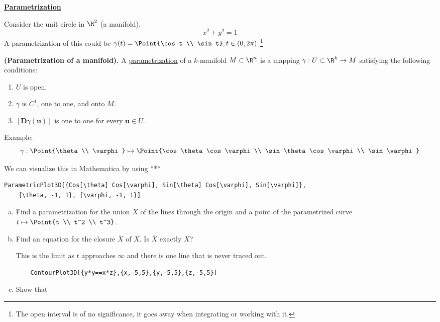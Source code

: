 
\ul{\textbf{Parametrization}}

Consider the unit circle in $\R^2$ (a manifold). 
\[x^2+y^2=1\]
A parametrization of this could be $\gamma(t)=\Point{\cos t \\ \sin t}, t\in (0,2\pi)$ \footnote{The open interval is of no significance, it goes away when integrating or working with it. }

\begin{defn}
	\textbf{(Parametrization of a manifold).} A \ul{parametrization} of a $k$-manifold $M\subset \R^n$ is a mapping $\gamma : U \subset \R^k \to M$ satisfying the following conditions: 
	\begin{enumerate}[1.]
	\item $U$ is open. 
	\item $\gamma$ is $C^1$, one to one, and onto $M$. 
	\item $\left[\mathbf{D}\gamma (\bm{u})\right]$ is one to one for every $\bm{u}\in U$. 
	\end{enumerate}
\end{defn}

Example: 
\[\gamma : \Point{\theta \\ \varphi} \mapsto \Point{\cos \theta \cos \varphi \\ \sin \theta \cos \varphi \\ \sin \varphi}\]

We can visualize this in Mathematica by using
***
\lstset{language=Mathematica}
\footnotesize
\begin{lstlisting}
ParametricPlot3D[{Cos[\theta] Cos[\varphi], Sin[\theta] Cos[\varphi], Sin[\varphi]}, 
	{\theta, -1, 1}, {\varphi, -1, 1}]
\end{lstlisting}
\normalsize

\begin{enumerate}[a.]
	\item Find a parametrization for the union $X$ of the lines through the origin and a point of the parametrized curve $t\mapsto \Point{t \\ t^2 \\ t^3}$. 
	
	
	\item Find an equation for the closure $\overline{X}$ of $X$. Is $\overline{X}$ exactly $X$? 
	
	  This is the limit as $t$ approaches $\infty$ and there is one line that is never traced out. 
	
	\footnotesize
	\begin{lstlisting}
	ContourPlot3D[{y*y==x*z},{x,-5,5},{y,-5,5},{z,-5,5}]
	\end{lstlisting}
	\normalsize
	
	\item Show that 
	
	
\end{enumerate}